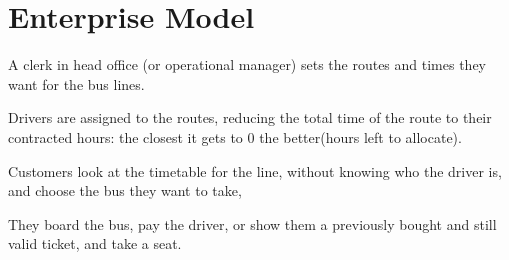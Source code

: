 \section{Enterprise Model}
A clerk in head office (or operational manager) sets the routes and times they want for the bus lines.

Drivers are assigned to the routes, reducing the total time of the route to their contracted hours: the closest it gets to 0 the better(hours left to allocate).

Customers look at the timetable for the line, without knowing who the driver is, and choose the bus they want to take,

They board the bus, pay the driver, or show them a previously bought and still valid ticket, and take a seat.
